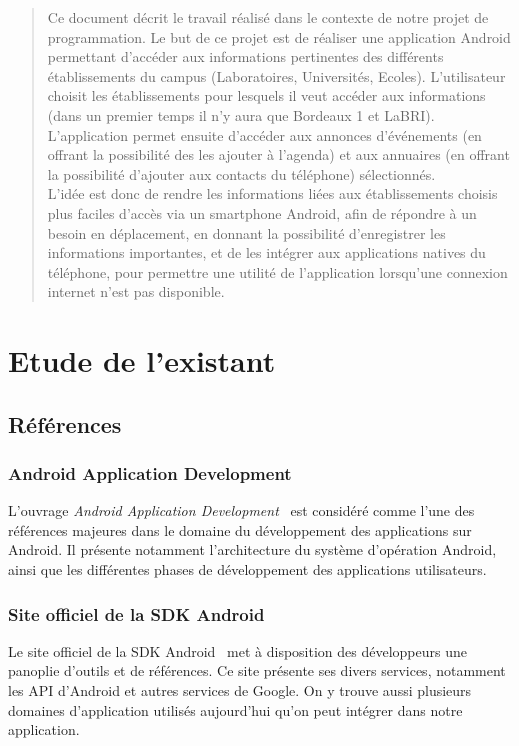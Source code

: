 \documentclass [pdftex,12pt] {report}
\begin{document}


\newpage

\begin{abstract}
Ce document décrit le travail réalisé dans le contexte de notre projet de programmation. Le but de ce projet est de réaliser une application Android permettant d'accéder aux informations pertinentes des différents établissements du campus (Laboratoires, Universités, Ecoles). L'utilisateur choisit les établissements pour lesquels il veut accéder aux informations (dans un premier temps il n'y aura que Bordeaux 1 et LaBRI). L'application permet ensuite d'accéder aux annonces d'événements (en offrant la possibilité des les ajouter à l'agenda) et aux annuaires (en offrant la possibilité d'ajouter aux contacts du téléphone) sélectionnés. \\
L'idée est donc de rendre les informations liées aux établissements choisis plus faciles d'accès via un smartphone Android, afin de répondre à un besoin en déplacement, en donnant la possibilité d'enregistrer les informations importantes, et de les intégrer aux applications natives du téléphone, pour permettre une utilité de l'application lorsqu'une connexion internet n'est pas disponible.
\end{abstract}


\vspace{2cm}
\tableofcontents
\newpage 

\chapter{Etude de l'existant}
\section{Références}


\subsection{Android Application Development}
L'ouvrage \emph{Android Application Development}~\cite{AndroidBook} est considéré comme l'une des références majeures dans le domaine du développement des applications sur Android.
Il présente notamment l'architecture du système d'opération Android, ainsi que les différentes phases de développement des applications utilisateurs.

\subsection{Site officiel de la SDK Android}
Le site officiel de la SDK Android~\cite{AndroidSDK} met à disposition des développeurs une panoplie d'outils et de références.
Ce site présente ses divers services, notamment les API d'Android et autres services de Google. On y trouve aussi plusieurs domaines d'application utilisés aujourd'hui qu'on peut intégrer dans notre application.
\end{document}
